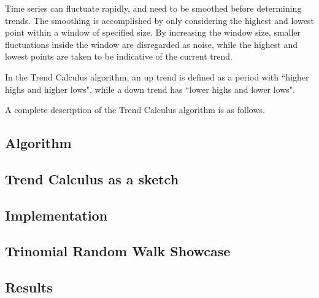 \documentclass[../trend-calculus.tex]{subfiles}
\begin{document}
  Time series can fluctuate rapidly, and need to be smoothed before determining trends.
  The smoothing is accomplished by only considering the 
  highest and lowest point within a window of specified size.
  By increasing the window size, smaller fluctuations inside the window are disregarded as noise, 
  while the highest and lowest points are taken to be indicative of the current trend.

  In the Trend Calculus algorithm, an up trend is defined as a period with 
  ``higher highs and higher lows", while a down trend has ``lower highs and lower lows".

 A complete description of the Trend Calculus algorithm is as follows.

  \subsection{Algorithm}
    

  \subsection{Trend Calculus as a sketch}
    

  \subsection{Implementation}
    

  \subsection{Trinomial Random Walk Showcase}
    

  \subsection{Results}
    
\end{document}
